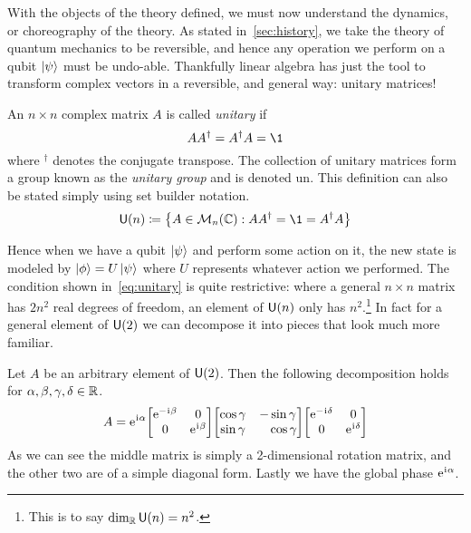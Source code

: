 With the objects of the theory defined, we must now understand the dynamics, or choreography of the theory.
As stated in~\cref{sec:history}, we take the theory of quantum mechanics to be reversible, and hence any operation we perform on a qubit $\ket{\psi}$ must be undo-able.
Thankfully linear algebra has just the tool to transform complex vectors in a reversible, and general way: unitary matrices!
\begin{definition}
    An $n\times n$ complex matrix $A$ is called \emph{unitary} if
    \begin{equation}\label{eq:unitary}
        AA^\dagger = A^\dagger A = \1
    \end{equation}
    where $^\dagger$ denotes the conjugate transpose.
    The collection of unitary matrices form a group known as the \emph{unitary group} and is denoted \gls{un}.
    This definition can also be stated simply using set builder notation.
    \begin{equation}
        \U{n} \defeq \qty{ A \in \mats{n}{\C} : AA^\dagger = \1 = A^\dagger A} %
    \end{equation}
\end{definition}
Hence when we have a qubit $\ket{\psi}$ and perform some action on it, the new state is modeled by $\ket{\phi} = U\ket{\psi}$ where $U$ represents whatever action we performed.
The condition shown in~\cref{eq:unitary} is quite restrictive: where a general $n \times n$ matrix has $2n^2$ real degrees of freedom, an element of $\mathsf{U} (n)$ only has $n^2$.\footnote{This is to say $\dim_{\mathbb{R}}\mathsf{U} (n) = n^2$.}
In fact for a general element of $\mathsf{U} (2)$ we can decompose it into pieces that look much more familiar. %
\begin{example}\label{ex:u2decomp}
    Let $A$ be an arbitrary element of $\mathsf{U} (2)$.
    Then the following decomposition holds for $\alpha, \beta, \gamma, \delta \in \mathbb{R}$.
    \begin{equation}
        A = \e^{\iu\alpha}\mqty[\dmat[0]{\e^{-\iu \beta}, \e^{\iu \beta}}]\mqty[\cos\gamma & -\sin\gamma \\ \sin\gamma & \phantom{+}\cos\gamma]\mqty[\dmat[0]{\e^{-\iu \delta}, \e^{\iu \delta}}]
    \end{equation}
    As we can see the middle matrix is simply a 2-dimensional rotation matrix, and the other two are of a simple diagonal form.
    Lastly we have the global phase $\mathrm{e}^{\mkern1mu\mathrm{i}\mkern1mu \alpha}$.
\end{example}

